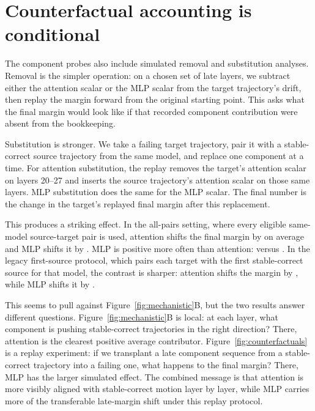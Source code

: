 \documentclass[10pt,twocolumn]{article}
\begin{document}
\section{Counterfactual accounting is conditional}

The component probes also include simulated removal and substitution analyses. Removal is the simpler operation: on a chosen set of late layers, we subtract either the attention scalar or the MLP scalar from the target trajectory's drift, then replay the margin forward from the original starting point. This asks what the final margin would look like if that recorded component contribution were absent from the bookkeeping.

Substitution is stronger. We take a failing target trajectory, pair it with a stable-correct source trajectory from the same model, and replace one component at a time. For attention substitution, the replay removes the target's attention scalar on layers 20--27 and inserts the source trajectory's attention scalar on those same layers. MLP substitution does the same for the MLP scalar. The final number is the change in the target's replayed final margin after this replacement.

This produces a striking effect. In the all-pairs setting, where every eligible same-model source-target pair is used, attention shifts the final margin by \AllPairsAttentionShift{} on average and MLP shifts it by \AllPairsMlpShift{}. MLP is positive more often than attention: \AllPairsMlpPositive{} versus \AllPairsAttentionPositive{}. In the legacy first-source protocol, which pairs each target with the first stable-correct source for that model, the contrast is sharper: attention shifts the margin by \LegacyAttentionShift{}, while MLP shifts it by \LegacyMlpShift{}.

This seems to pull against Figure~\ref{fig:mechanistic}B, but the two results answer different questions. Figure~\ref{fig:mechanistic}B is local: at each layer, what component is pushing stable-correct trajectories in the right direction? There, attention is the clearest positive average contributor. Figure~\ref{fig:counterfactuals} is a replay experiment: if we transplant a late component sequence from a stable-correct trajectory into a failing one, what happens to the final margin? There, MLP has the larger simulated effect. The combined message is that attention is more visibly aligned with stable-correct motion layer by layer, while MLP carries more of the transferable late-margin shift under this replay protocol.
\end{document}
